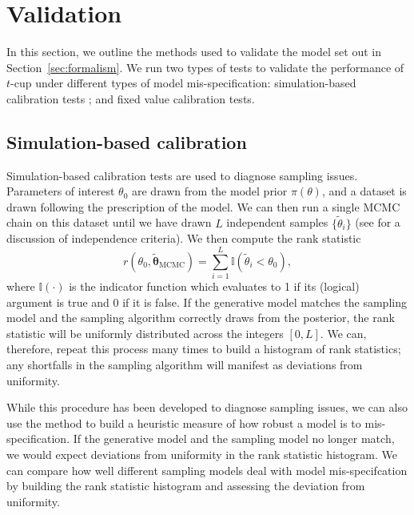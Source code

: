 \documentclass[fleqn,usenatbib]{rasti}
\begin{document}
\section{Validation}
\label{sec:methods}

In this section, we outline the methods used to validate the model set out in
Section~\ref{sec:formalism}. We run two types of tests to validate the performance of
$t$-cup under different types of model mis-specification: simulation-based
calibration tests \citep{Cook:2006, Talts:2018}; and fixed value calibration
tests.

\subsection{Simulation-based calibration}
\label{sec:methods.sbc}

Simulation-based calibration tests \citep{Cook:2006, Talts:2018} are used to
diagnose sampling issues. Parameters of interest $\theta_0$ are drawn from the
model prior $\pi(\theta)$, and a dataset is drawn following the prescription of
the model. We can then run a single MCMC chain on this dataset until we have
drawn $L$ independent samples $\{\tilde{\theta}_{i}\}$ (see \citet{Talts:2018}
for a discussion of independence criteria). We then compute the rank statistic
\begin{equation}
    r(\theta_0, \tilde{\boldsymbol{\theta}}_{\text{MCMC}})
        = \sum_{i = 1}^{L} \mathbb I (\tilde{\theta}_i < \theta_0),
\end{equation}
where $\mathbb{I}(\cdot)$ is the indicator function which evaluates to 1 if its (logical) argument is true and 0 if it is false.
If the generative model matches the sampling model and the sampling algorithm
correctly draws from the posterior, the rank statistic will be uniformly
distributed across the integers $[0, L]$. We can, therefore, repeat this process
many times to build a histogram of rank statistics; any shortfalls in the
sampling algorithm will manifest as deviations from uniformity.

While this procedure has been developed to diagnose sampling issues, we can also
use the method to build a heuristic measure of how robust a model is to
mis-specification. If the generative model and the sampling model no longer
match, we would expect deviations from uniformity in the rank statistic
histogram. We can compare how well different sampling models deal with model
mis-specifcation by building the rank statistic histogram and assessing the
deviation from uniformity.
\end{document}
